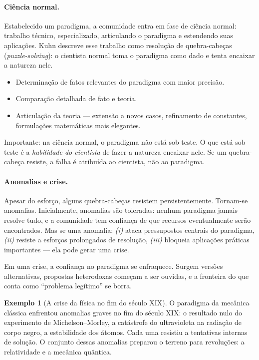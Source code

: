 \documentclass[9pt,a4paper]{extarticle}
\newcommand{\impt}[1]{\textcolor{important}{#1}}
\newcommand{\ntc}[1]{\textcolor{notice}{#1}}
\theoremstyle{definition}
\newtheorem{example}{Exemplo}[section]
\begin{document}
\paragraph{Ciência normal.}
Estabelecido um paradigma, a comunidade entra em fase de \impt{ciência normal}: trabalho técnico, especializado, articulando o paradigma e estendendo suas aplicações. Kuhn descreve esse trabalho como \impt{resolução de quebra-cabeças} (\emph{puzzle-solving}): o cientista normal toma o paradigma como dado e tenta encaixar a natureza nele.

\begin{itemize}
  \item Determinação de fatos relevantes do paradigma com maior precisão.
  \item Comparação detalhada de fato e teoria.
  \item Articulação da teoria --- extensão a novos casos, refinamento de constantes, formulações matemáticas mais elegantes.
\end{itemize}

\ntc{Importante:} na ciência normal, o paradigma \impt{não está sob teste}. O que está sob teste é a \emph{habilidade do cientista} de fazer a natureza encaixar nele. Se um quebra-cabeça resiste, a falha é atribuída ao cientista, não ao paradigma.

\paragraph{Anomalias e crise.}
Apesar do esforço, alguns quebra-cabeças resistem persistentemente. Tornam-se \impt{anomalias}. Inicialmente, anomalias são toleradas: nenhum paradigma jamais resolve tudo, e a comunidade tem confiança de que recursos eventualmente serão encontrados. Mas se uma anomalia: \emph{(i)} ataca pressupostos centrais do paradigma, \emph{(ii)} resiste a esforços prolongados de resolução, \emph{(iii)} bloqueia aplicações práticas importantes --- ela pode gerar uma \impt{crise}.

Em uma crise, a confiança no paradigma se enfraquece. Surgem versões alternativas, propostas heterodoxas começam a ser ouvidas, e a fronteira do que conta como ``problema legítimo'' se borra.

\begin{example}[A crise da física no fim do século XIX]
O paradigma da mecânica clássica enfrentou anomalias graves no fim do século XIX: o resultado nulo do experimento de Michelson--Morley, a catástrofe do ultravioleta na radiação de corpo negro, a estabilidade dos átomos. Cada uma resistiu a tentativas internas de solução. O conjunto dessas anomalias preparou o terreno para revoluções: a relatividade e a mecânica quântica.
\end{example}
\end{document}

